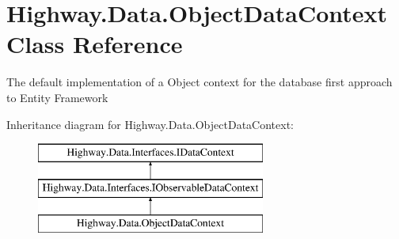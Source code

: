 \hypertarget{class_highway_1_1_data_1_1_object_data_context}{\section{Highway.\-Data.\-Object\-Data\-Context Class Reference}
\label{class_highway_1_1_data_1_1_object_data_context}
}


The default implementation of a Object context for the database first approach to Entity Framework  


Inheritance diagram for Highway.\-Data.\-Object\-Data\-Context\-:\begin{figure}[H]
\begin{center}
\leavevmode
\includegraphics[height=3.000000cm]{class_highway_1_1_data_1_1_object_data_context}
\end{center}
\end{figure}
